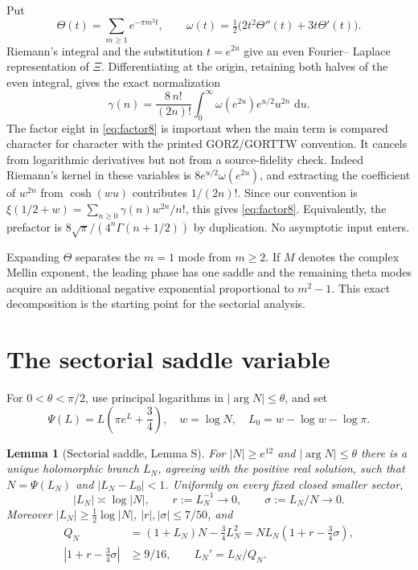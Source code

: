 \documentclass[11pt]{article}
\newtheorem{lemma}[theorem]{Lemma}
\theoremstyle{definition}
\theoremstyle{remark}
\newcommand{\dd}{\,\mathrm d}
\begin{document}
Put
\[
 \Theta(t)=\sum_{m\ge1}e^{-\pi m^2t},\qquad
 \omega(t)=\tfrac12\bigl(2t^2\Theta''(t)+3t\Theta'(t)\bigr).
\]
Riemann's integral and the substitution $t=e^{2u}$ give an even Fourier--
Laplace representation of $\Xi$.  Differentiating at the origin, retaining
both halves of the even integral, gives the exact normalization
\begin{equation}\label{eq:factor8}
  \gamma(n)=\frac{8\,n!}{(2n)!}
       \int_0^\infty \omega(e^{2u})e^{u/2}u^{2n}\,\dd u .
\end{equation}
The factor eight in \eqref{eq:factor8} is important when the main term is
compared character for character with the printed GORZ/GORTTW convention.
It cancels from logarithmic derivatives but not from a source-fidelity
check.  Indeed Riemann's kernel in these variables is
$8e^{u/2}\omega(e^{2u})$, and extracting the coefficient of $w^{2n}$
from $\cosh(wu)$ contributes $1/(2n)!$.  Since our convention is
$\xi(1/2+w)=\sum_{n\ge0}\gamma(n)w^{2n}/n!$, this gives
\eqref{eq:factor8}.  Equivalently, the prefactor is
$8\sqrt\pi/(4^n\Gamma(n+1/2))$ by duplication.  No asymptotic input enters.

Expanding $\Theta$ separates the $m=1$ mode from $m\ge2$.  If $M$ denotes the
complex Mellin exponent, the leading phase has one saddle and the remaining
theta modes acquire an additional negative exponential proportional to
$m^2-1$.  This exact decomposition is the starting point for the sectorial
analysis.

\section{The sectorial saddle variable}\label{sec:saddle}

For $0<\theta<\pi/2$, use principal logarithms in
$|\arg N|\le\theta$, and set
\[
 \Psi(L)=L\left(\pi e^L+\frac34\right),\quad
 w=\log N,\quad L_0=w-\log w-\log\pi.
\]

\begin{lemma}[Sectorial saddle, Lemma S]\label{lem:saddle}
For $|N|\ge e^{12}$ and $|\arg N|\le\theta$ there is a unique holomorphic
branch $L_N$, agreeing with the positive real solution, such that
$N=\Psi(L_N)$ and $|L_N-L_0|<1$.  Uniformly on every fixed closed smaller
sector,
\[
 |L_N|\asymp\log|N|,\qquad r:=L_N^{-1}\longrightarrow0,\qquad
 \sigma:=L_N/N\longrightarrow0.
\]
Moreover $|L_N|\ge\tfrac12\log|N|$, $|r|,|\sigma|\le7/50$, and
\begin{align}
 Q_N&=(1+L_N)N-\tfrac34L_N^2
     =NL_N(1+r-\tfrac34\sigma),\label{eq:Q}\\
 |1+r-\tfrac34\sigma|&\ge9/16,\qquad L_N'=L_N/Q_N.\label{eq:Qbound}
\end{align}
\end{lemma}
\end{document}
